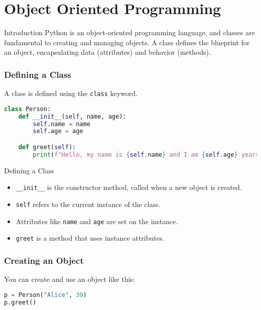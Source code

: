 \section{Object Oriented Programming}

\begin{frame}[plain]
\sectionpage
\end{frame}



\begin{frame}{Introduction}
Python is an object-oriented programming language, and classes are fundamental to creating and managing objects. A class defines the blueprint for an object, encapsulating data (attributes) and behavior (methods).
\end{frame}



\begin{frame}[fragile]
\frametitle{Defining a Class}
A class is defined using the \texttt{class} keyword.

\begin{lstlisting}[language=python]
class Person:
    def __init__(self, name, age):
        self.name = name
        self.age = age

    def greet(self):
        print(f"Hello, my name is {self.name} and I am {self.age} years old.")
\end{lstlisting}
\end{frame}


\begin{frame}{Defining a Class}
\begin{itemize}
\item \texttt{\_\_init\_\_} is the constructor method, called when a new object is created.
\item \texttt{self} refers to the current instance of the class.
\item Attributes like \texttt{name} and \texttt{age} are set on the instance.
\item \texttt{greet} is a method that uses instance attributes.
 \end{itemize}
 \end{frame}



\begin{frame}[fragile]
\frametitle{Creating an Object}
You can create and use an object like this:

\begin{lstlisting}[language=Python]
p = Person("Alice", 30)
p.greet()
\end{lstlisting}

\end{frame}


